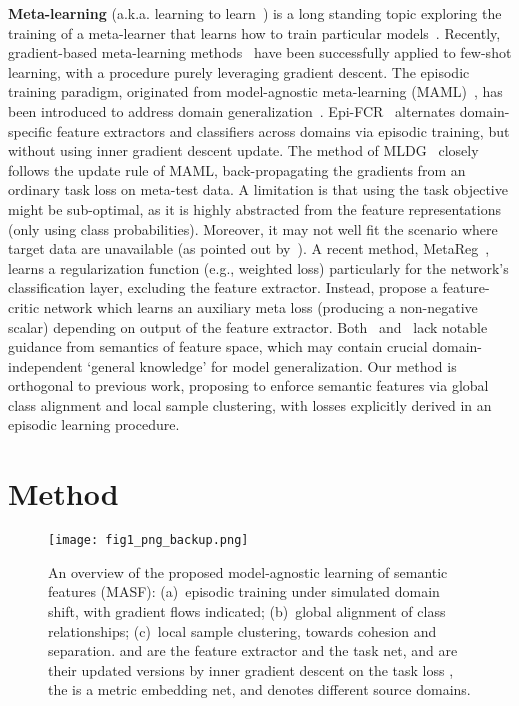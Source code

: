 \documentclass{article}
\begin{document}
\textbf{Meta-learning} (a.k.a. learning to learn~\citep{schmidhuber1987evolutionary,Thrun:1998:LL:296635}) is a long standing topic exploring the training of a meta-learner that learns how to train particular models~\citep{finn2017model,li2016learning,nichol2018first,ravi2016optimization}. 
Recently, gradient-based meta-learning methods~\citep{finn2017model,nichol2018first} have been successfully applied to few-shot learning, with a procedure purely leveraging gradient descent.
The episodic training paradigm, originated from model-agnostic meta-learning (MAML)~\citep{finn2017model}, has been introduced to address domain generalization~\citep{balaji2018metareg,li2018learning,li2019episodic,li2019feature}.
Epi-FCR~\citep{li2019episodic} alternates domain-specific feature extractors and classifiers across domains via episodic training, but without using inner gradient descent update.
The method of MLDG~\citep{li2018learning} closely follows the update rule of MAML, 
back-propagating the gradients from an ordinary task loss on meta-test data.
A limitation is that using the task objective might be sub-optimal, as it is highly abstracted from the feature representations (only using class probabilities). Moreover, it may not well fit the scenario where target data are unavailable (as pointed out by~\citet{balaji2018metareg}).
A recent method, MetaReg~\citep{balaji2018metareg}, learns a regularization function (e.g., weighted  loss) particularly for the network's classification layer, excluding the feature extractor. Instead, \citet{li2019feature} propose a feature-critic network which learns an auxiliary meta loss (producing a non-negative scalar) depending on output of the feature extractor. Both~\citep{balaji2018metareg} and~\citep{li2019feature} lack notable guidance from semantics of feature space, which may contain crucial domain-independent `general knowledge' for model generalization.
Our method is orthogonal to previous work,
proposing to enforce semantic features via
global class alignment and local sample clustering, 
with losses explicitly derived in an episodic learning procedure. 

 
\section{Method}


\begin{figure}[t]
    \centering
    \def\svgwidth{\textwidth}
\texttt{[image: fig1\_png\_backup.png]}
     \vspace{-1mm}
    \caption{An overview of the proposed model-agnostic learning of semantic features (MASF): (a)~episodic training under simulated domain shift, with gradient flows indicated; (b)~global alignment of class relationships; (c)~local sample clustering, towards cohesion and separation.  and  are the feature extractor and the task net,  and  are their updated versions by inner gradient descent on the task loss , the  is a metric embedding net, and  denotes different source domains.}
    \label{fig:overview}
    \vspace{-2mm}
\end{figure}
\end{document}
